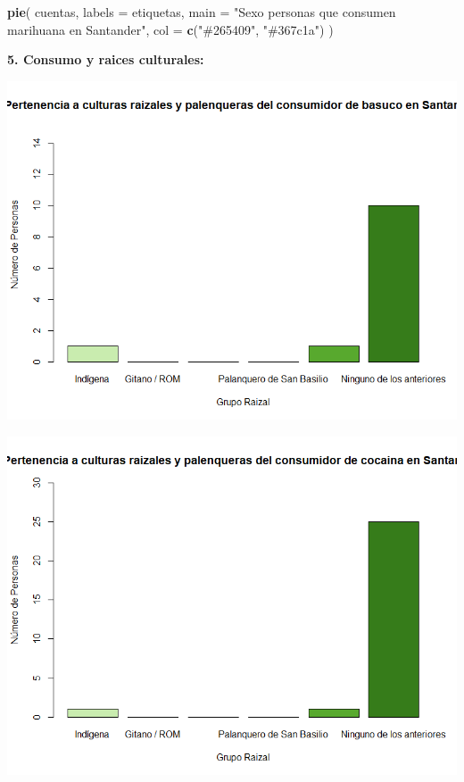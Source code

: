 \documentclass[
]{article}
\newenvironment{Shaded}{\begin{snugshade}}{\end{snugshade}}
\newcommand{\AttributeTok}[1]{\textcolor[rgb]{0.13,0.29,0.53}{#1}}
\newcommand{\FunctionTok}[1]{\textcolor[rgb]{0.13,0.29,0.53}{\textbf{#1}}}
\newcommand{\NormalTok}[1]{#1}
\newcommand{\StringTok}[1]{\textcolor[rgb]{0.31,0.60,0.02}{#1}}
\begin{document}
\begin{Shaded}
\begin{Highlighting}[]
\FunctionTok{pie}\NormalTok{(}
\NormalTok{  cuentas,}
  \AttributeTok{labels =}\NormalTok{ etiquetas,}
  \AttributeTok{main =} \StringTok{"Sexo personas que consumen marihuana en Santander"}\NormalTok{,}
  \AttributeTok{col =} \FunctionTok{c}\NormalTok{(}\StringTok{"\#265409"}\NormalTok{, }\StringTok{"\#367c1a"}\NormalTok{)}
\NormalTok{)}
\end{Highlighting}
\end{Shaded}

\hfill\break

\textbf{5. Consumo y raices culturales:}

\includegraphics{images/basuco cultura santander.png}

\includegraphics{images/cocaina cultura santander.png}
\end{document}
